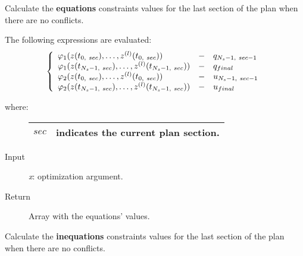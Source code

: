 \documentclass[letterpaper,10pt,english]{sphinxmanual}
\begin{document}
\begin{fulllineitems}

\begin{fulllineitems}
\label{Multi-robot motion planner:planning_sim.Robot._ls_sa_feqcons}
Calculate the \textbf{equations} constraints values for the last section of the plan when
there are no conflicts.

The following expressions are evaluated:
\begin{gather}
\begin{split}\left\lbrace\begin{array}{lcl}
\varphi_1(z(t_{0,\ sec}),\dotsc,z^{(l)}(t_{0,\ sec}))
&-& q_{N_s-1,\ sec-1}\\
\varphi_1(z(t_{N_s-1,\ sec}),\dotsc,z^{(l)}(t_{N_s-1,\ sec}))
&-& q_{final}\\
\varphi_2(z(t_{0,\ sec}),\dotsc,z^{(l)}(t_{0,\ sec}))
&-&u_{N_s-1,\ sec-1}\\
\varphi_2(z(t_{N_s-1,\ sec}),\dotsc,z^{(l)}(t_{N_s-1,\ sec})) &-& u_{final}\\
\end{array}\right.\end{split}\notag
\end{gather}\begin{description}
\item[{where:}] \leavevmode
\begin{tabulary}{\linewidth}{|L|L|}
\hline

\(sec\)
 & 
indicates the current plan section.
\\
\hline\end{tabulary}


\item[{Input}] \leavevmode
\emph{x}: optimization argument.

\item[{Return}] \leavevmode
Array with the equations' values.

\end{description}

\end{fulllineitems}


\begin{fulllineitems}
\label{Multi-robot motion planner:planning_sim.Robot._ls_sa_fieqcons}
Calculate the \textbf{inequations} constraints values for the last section of the plan when
there are no conflicts.


\end{fulllineitems}
\end{fulllineitems}
\end{document}
